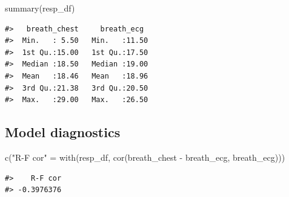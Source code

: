 \documentclass[
]{article}
\newenvironment{Shaded}{\begin{snugshade}}{\end{snugshade}}
\newcommand{\AttributeTok}[1]{\textcolor[rgb]{0.77,0.63,0.00}{#1}}
\newcommand{\ConstantTok}[1]{\textcolor[rgb]{0.00,0.00,0.00}{#1}}
\newcommand{\DecValTok}[1]{\textcolor[rgb]{0.00,0.00,0.81}{#1}}
\newcommand{\FunctionTok}[1]{\textcolor[rgb]{0.00,0.00,0.00}{#1}}
\newcommand{\NormalTok}[1]{#1}
\newcommand{\OtherTok}[1]{\textcolor[rgb]{0.56,0.35,0.01}{#1}}
\newcommand{\SpecialCharTok}[1]{\textcolor[rgb]{0.00,0.00,0.00}{#1}}
\newcommand{\StringTok}[1]{\textcolor[rgb]{0.31,0.60,0.02}{#1}}
\begin{document}
\begin{Shaded}
\begin{Highlighting}[]
\FunctionTok{summary}\NormalTok{(resp\_df)}
\end{Highlighting}
\end{Shaded}

\begin{verbatim}
#>   breath_chest     breath_ecg   
#>  Min.   : 5.50   Min.   :11.50  
#>  1st Qu.:15.00   1st Qu.:17.50  
#>  Median :18.50   Median :19.00  
#>  Mean   :18.46   Mean   :18.96  
#>  3rd Qu.:21.38   3rd Qu.:20.50  
#>  Max.   :29.00   Max.   :26.50
\end{verbatim}

\hypertarget{model-diagnostics}{%
\subsection{Model diagnostics}\label{model-diagnostics}}

\begin{Shaded}
\begin{Highlighting}[]
\FunctionTok{c}\NormalTok{(}\StringTok{"R{-}F cor"} \OtherTok{=} \FunctionTok{with}\NormalTok{(resp\_df, }\FunctionTok{cor}\NormalTok{(breath\_chest }\SpecialCharTok{{-}}\NormalTok{ breath\_ecg, breath\_ecg)))}
\end{Highlighting}
\end{Shaded}

\begin{verbatim}
#>    R-F cor 
#> -0.3976376
\end{verbatim}

\begin{Shaded}
\end{Shaded}
\end{document}
